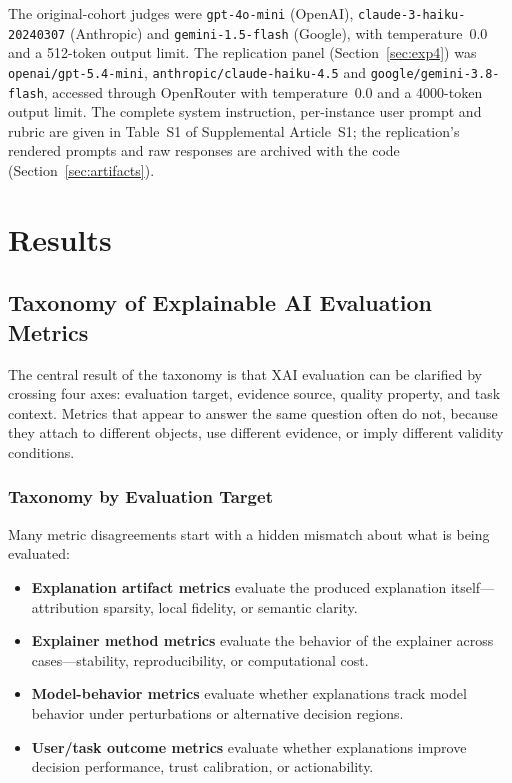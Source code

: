 \documentclass[fleqn,10pt,lineno]{wlpeerj}
\begin{document}
The original-cohort judges were \texttt{gpt-4o-mini} (OpenAI),
\texttt{claude-3-haiku-20240307} (Anthropic) and \texttt{gemini-1.5-flash}
(Google), with temperature~0.0 and a 512-token output limit. The replication
panel (Section~\ref{sec:exp4}) was \texttt{openai/gpt-5.4-mini},
\texttt{anthropic/claude-haiku-4.5} and \texttt{google/gemini-3.8-flash},
accessed through OpenRouter with temperature~0.0 and a 4000-token output
limit. The complete system instruction, per-instance user prompt and rubric
are given in Table~S1 of Supplemental Article~S1; the replication's rendered
prompts and raw responses are archived with the code (Section~\ref{sec:artifacts}).


\section{Results}
\label{sec:results_all}


\subsection{Taxonomy of Explainable AI Evaluation Metrics}
\label{sec:taxonomy}

The central result of the taxonomy is that XAI evaluation can be
clarified by crossing four axes: evaluation target, evidence source,
quality property, and task context. Metrics that appear to answer the
same question often do not, because they attach to different objects, use
different evidence, or imply different validity conditions.

\subsubsection{Taxonomy by Evaluation Target}

Many metric disagreements start with a hidden mismatch about what is
being evaluated:
\begin{itemize}[leftmargin=*]
\item \textbf{Explanation artifact metrics} evaluate the produced
explanation itself---attribution sparsity, local fidelity, or semantic
clarity.
\item \textbf{Explainer method metrics} evaluate the behavior of the
explainer across cases---stability, reproducibility, or computational
cost.
\item \textbf{Model-behavior metrics} evaluate whether explanations track
model behavior under perturbations or alternative decision regions.
\item \textbf{User/task outcome metrics} evaluate whether explanations
improve decision performance, trust calibration, or actionability.
\end{itemize}
\end{document}
